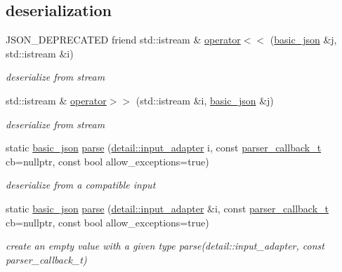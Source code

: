 \subsection*{deserialization}
\begin{DoxyCompactItemize}
\item 
J\+S\+O\+N\+\_\+\+D\+E\+P\+R\+E\+C\+A\+T\+ED friend std\+::istream \& \mbox{\hyperlink{classnlohmann_1_1basic__json_ab7285a92514fcdbe6de505ebaba92ea3}{operator$<$$<$}} (\mbox{\hyperlink{classnlohmann_1_1basic__json}{basic\+\_\+json}} \&j, std\+::istream \&i)
\begin{DoxyCompactList}\small\item\em deserialize from stream \end{DoxyCompactList}\item 
std\+::istream \& \mbox{\hyperlink{classnlohmann_1_1basic__json_aaf363408931d76472ded14017e59c9e8}{operator$>$$>$}} (std\+::istream \&i, \mbox{\hyperlink{classnlohmann_1_1basic__json}{basic\+\_\+json}} \&j)
\begin{DoxyCompactList}\small\item\em deserialize from stream \end{DoxyCompactList}\item 
static \mbox{\hyperlink{classnlohmann_1_1basic__json}{basic\+\_\+json}} \mbox{\hyperlink{classnlohmann_1_1basic__json_aa9676414f2e36383c4b181fe856aa3c0}{parse}} (\mbox{\hyperlink{classnlohmann_1_1detail_1_1input__adapter}{detail\+::input\+\_\+adapter}} i, const \mbox{\hyperlink{classnlohmann_1_1basic__json_ab4f78c5f9fd25172eeec84482e03f5b7}{parser\+\_\+callback\+\_\+t}} cb=nullptr, const bool allow\+\_\+exceptions=true)
\begin{DoxyCompactList}\small\item\em deserialize from a compatible input \end{DoxyCompactList}\item 
static \mbox{\hyperlink{classnlohmann_1_1basic__json}{basic\+\_\+json}} \mbox{\hyperlink{classnlohmann_1_1basic__json_af3501e04d3c7a824bffb05a5a45ba884}{parse}} (\mbox{\hyperlink{classnlohmann_1_1detail_1_1input__adapter}{detail\+::input\+\_\+adapter}} \&i, const \mbox{\hyperlink{classnlohmann_1_1basic__json_ab4f78c5f9fd25172eeec84482e03f5b7}{parser\+\_\+callback\+\_\+t}} cb=nullptr, const bool allow\+\_\+exceptions=true)
\begin{DoxyCompactList}\small\item\em create an empty value with a given type parse(detail\+::input\+\_\+adapter, const parser\+\_\+callback\+\_\+t) \end{DoxyCompactList}\item 

\end{DoxyCompactItemize}
